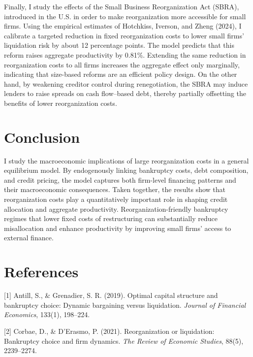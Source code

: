 \documentclass[12pt]{article}
\begin{document}
Finally, I study the effects of the Small Business Reorganization Act (SBRA), introduced in the U.S. in order to make reorganization more accessible for small firms. Using the empirical estimates of Hotchkiss, Iverson, and Zheng (2024), I calibrate a targeted reduction in fixed reorganization costs to lower small firms' liquidation risk by about 12 percentage points. The model predicts that this reform raises aggregate productivity by 0.81\%. Extending the same reduction in reorganization costs to all firms increases the aggregate effect only marginally, indicating that size-based reforms are an efficient policy design. On the other hand, by weakening creditor control during renegotiation, the SBRA may induce lenders to raise spreads on cash flow–based debt, thereby partially offsetting the benefits of lower reorganization costs.

\section{Conclusion}

I study the macroeconomic implications of large reorganization costs in a general equilibrium model. By endogenously linking bankruptcy costs, debt composition, and credit pricing, the model captures both firm-level financing patterns and their macroeconomic consequences. Taken together, the results show that reorganization costs play a quantitatively important role in shaping credit allocation and aggregate productivity. Reorganization-friendly bankruptcy regimes that lower fixed costs of restructuring can substantially reduce misallocation and enhance productivity by improving small firms' access to external finance.



\section*{References}
	
\noindent
\hangindent=0.7cm
[1] Antill, S., \& Grenadier, S. R. (2019). Optimal capital structure and bankruptcy choice: Dynamic bargaining versus liquidation. \textit{Journal of Financial Economics}, 133(1), 198--224.
\vspace{3mm}

\noindent
\hangindent=0.7cm
[2] Corbae, D., \& D’Erasmo, P. (2021). Reorganization or liquidation: Bankruptcy choice and firm dynamics. \textit{The Review of Economic Studies}, 88(5), 2239--2274.
\vspace{3mm}
\end{document}
